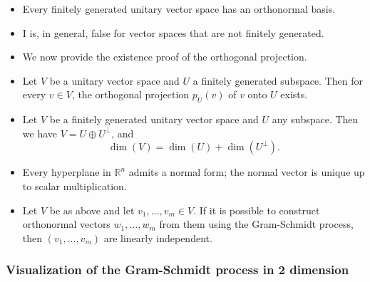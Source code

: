 \begin{itemize}[label=\(-\)]

    \item Every finitely generated unitary vector space has an orthonormal basis.

    \item I is, in general, false for vector spaces that are not finitely generated.

    \item We now provide the existence proof of the orthogonal projection.

    \item Let \( V \) be a unitary vector space and \( U \) a finitely generated subspace. Then for every \( v \in V \), the orthogonal projection \( p_U(v) \) of \( v \) onto \( U \) exists.
    
    \item Let \( V \) be a finitely generated unitary vector space and \( U \) any subspace. Then we have \( V = U \oplus U^\perp \), and
    \[
    \dim(V) = \dim(U) + \dim(U^\perp).
    \]
    
    \item Every hyperplane in \( \mathbb{R}^n \) admits a normal form; the normal vector is unique up to scalar multiplication.
    
    \item Let \( V \) be as above and let \( v_1, \ldots, v_m \in V \). If it is possible to construct orthonormal vectors \( w_1, \ldots, w_m \) from them using the Gram-Schmidt process, then \( (v_1, \ldots, v_m) \) are linearly independent.
    
\end{itemize}


\subsubsection{Visualization of the Gram-Schmidt process in 2 dimension}

\begin{center}
\end{center}

